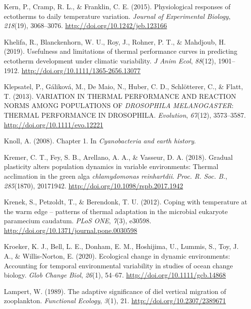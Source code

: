 \documentclass[12pt,twoside]{reedthesis}
\begin{document}
\leavevmode\hypertarget{ref-kern_physiological_2015-3}{}%
Kern, P., Cramp, R. L., \& Franklin, C. E. (2015). Physiological responses of ectotherms to daily temperature variation. \emph{Journal of Experimental Biology}, \emph{218}(19), 3068--3076. \url{http://doi.org/10.1242/jeb.123166}

\leavevmode\hypertarget{ref-khelifa_usefulness_2019}{}%
Khelifa, R., Blanckenhorn, W. U., Roy, J., Rohner, P. T., \& Mahdjoub, H. (2019). Usefulness and limitations of thermal performance curves in predicting ectotherm development under climatic variability. \emph{J Anim Ecol}, \emph{88}(12), 1901--1912. \url{http://doi.org/10.1111/1365-2656.13077}

\leavevmode\hypertarget{ref-klepsatel_variation_2013}{}%
Klepsatel, P., Gáliková, M., De Maio, N., Huber, C. D., Schlötterer, C., \& Flatt, T. (2013). VARIATION IN THERMAL PERFORMANCE AND REACTION NORMS AMONG POPULATIONS OF \emph{DROSOPHILA MELANOGASTER}: THERMAL PERFORMANCE IN DROSOPHILA. \emph{Evolution}, \emph{67}(12), 3573--3587. \url{http://doi.org/10.1111/evo.12221}

\leavevmode\hypertarget{ref-knoll_chapter_2008}{}%
Knoll, A. (2008). Chapter 1. In \emph{Cyanobacteria and earth history}.

\leavevmode\hypertarget{ref-kremer_gradual_2018}{}%
Kremer, C. T., Fey, S. B., Arellano, A. A., \& Vasseur, D. A. (2018). Gradual plasticity alters population dynamics in variable environments: Thermal acclimation in the green alga \emph{chlamydomonas reinhartdii}. \emph{Proc. R. Soc. B.}, \emph{285}(1870), 20171942. \url{http://doi.org/10.1098/rspb.2017.1942}

\leavevmode\hypertarget{ref-krenek_coping_2012}{}%
Krenek, S., Petzoldt, T., \& Berendonk, T. U. (2012). Coping with temperature at the warm edge -- patterns of thermal adaptation in the microbial eukaryote paramecium caudatum. \emph{PLoS ONE}, \emph{7}(3), e30598. \url{http://doi.org/10.1371/journal.pone.0030598}

\leavevmode\hypertarget{ref-kroeker_ecological_2020}{}%
Kroeker, K. J., Bell, L. E., Donham, E. M., Hoshijima, U., Lummis, S., Toy, J. A., \& Willis‐Norton, E. (2020). Ecological change in dynamic environments: Accounting for temporal environmental variability in studies of ocean change biology. \emph{Glob Change Biol}, \emph{26}(1), 54--67. \url{http://doi.org/10.1111/gcb.14868}

\leavevmode\hypertarget{ref-lampert_adaptive_1989}{}%
Lampert, W. (1989). The adaptive significance of diel vertical migration of zooplankton. \emph{Functional Ecology}, \emph{3}(1), 21. \url{http://doi.org/10.2307/2389671}
\end{document}
